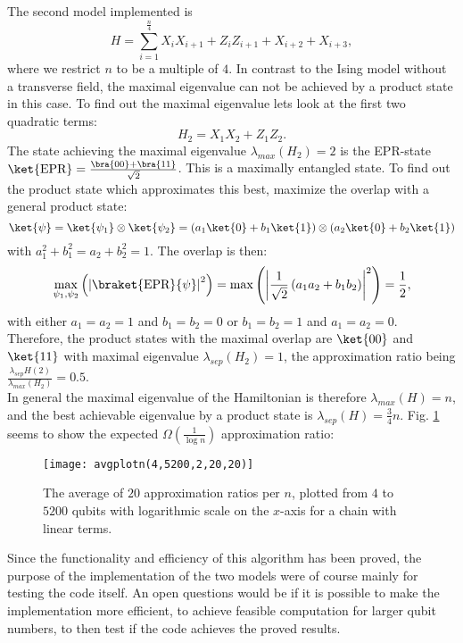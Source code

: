 \noindent The second model implemented is \[
	H = \sum_{i=1}^{\frac{n}{4}} X_iX_{i+1}+Z_iZ_{i+1}+X_{i+2}+X_{i+3},
\]
where we restrict $n$ to be a multiple of $4$.
In contrast to the Ising model without a transverse field, the maximal eigenvalue can not be achieved by a product state in this case.
To find out the maximal eigenvalue lets look at the first two quadratic terms:
\[
H_2=X_1X_2+Z_1Z_2
.\]
The state achieving the maximal eigenvalue $\lambda_{max}(H_2)=2$ is the EPR-state $\ket{\text{EPR}}=\frac{\bra{00}+\bra{11}}{\sqrt{2}}$.
This is a maximally entangled state.
To find out the product state which approximates this best, maximize the overlap with a general product state:
\[
	\ket{\psi}=\ket{\psi_1}\otimes\ket{\psi_2}=\left(a_1\ket{0}+b_1\ket{1}\right)\otimes\left(a_2\ket{0}+b_2\ket{1}\right)
\] with $a_1^2+b_1^2=a_2+b_2^2=1$.
The overlap is then:\[
\max_{\psi_1,\psi_2}\left(\left|\braket{\text{EPR}}{\psi}\right|^2\right)=\max\left(\left|\frac{1}{\sqrt{2}}\left(a_1a_2+b_1b_2\right)\right|^2\right)=\frac{1}{2}
,\]
with either $a_1=a_2=1$ and $b_1=b_2=0$ or $b_1=b_2=1$ and $a_1=a_2=0$.
Therefore, the product states with the maximal overlap are $\ket{00}$ and $\ket{11}$ with maximal eigenvalue $\lambda_{sep}(H_2)=1$, the approximation ratio being  $\frac{\lambda_{sep}H(2)}{\lambda_{max}(H_2)} = 0.5$.\\
In general the maximal eigenvalue of the Hamiltonian is therefore $\lambda_{max}(H)=n$, and the best achievable eigenvalue by a product state is $\lambda_{sep}(H)=\frac{3}{4}n$.
Fig. \ref{fig:3} seems to show the expected $\Omega\left( \frac{1}{\log{}n} \right) $ approximation ratio:
\begin{figure}[H]
	\centering
	\texttt{[image: avgplotn(4,5200,2,20,20)]}
	\caption{The average of $20$ approximation ratios per $n$, plotted from $4$ to $5200$ qubits with logarithmic scale on the $x$-axis for a chain with linear terms.}
	\label{fig:3}
\end{figure}
\noindent Since the functionality and efficiency of this algorithm has been proved, the purpose of the implementation of the two models were of course mainly for testing the code itself.
An open questions would be if it is possible to make the implementation more efficient, to achieve feasible computation for larger qubit numbers, to then test if the code achieves the proved results.
